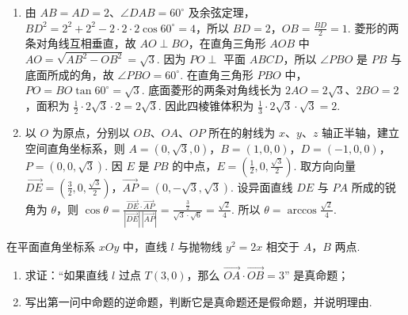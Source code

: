 \begin{solution}
\begin{enumerate}
\item 由 \(AB=AD=2\)、\(\angle DAB=60^{\circ}\) 及余弦定理，\(BD^2=2^2+2^2-2\cdot2\cdot2\cos60^{\circ}=4\)，所以 \(BD=2\)，\(OB=\frac{BD}{2}=1\). 菱形的两条对角线互相垂直，故 \(AO\perp BO\)，在直角三角形 \(AOB\) 中 \(AO=\sqrt{AB^2-OB^2}=\sqrt{3}\). 因为 \(PO\perp\) 平面 \(ABCD\)，所以 \(\angle PBO\) 是 \(PB\) 与底面所成的角，故 \(\angle PBO=60^{\circ}\). 在直角三角形 \(PBO\) 中，\(PO=BO\tan60^{\circ}=\sqrt{3}\). 底面菱形的两条对角线长为 \(2AO=2\sqrt{3}\)、\(2BO=2\)，面积为 \(\frac{1}{2}\cdot2\sqrt{3}\cdot2=2\sqrt{3}\). 因此四棱锥体积为 \(\frac{1}{3}\cdot2\sqrt{3}\cdot\sqrt{3}=2\).
\item 以 \(O\) 为原点，分别以 \(OB\)、\(OA\)、\(OP\) 所在的射线为 \(x\)、\(y\)、\(z\) 轴正半轴，建立空间直角坐标系，则
\(A=(0,\sqrt{3},0)\)，\(B=(1,0,0)\)，\(D=(-1,0,0)\)，\(P=(0,0,\sqrt{3})\). 因 \(E\) 是 \(PB\) 的中点，\(E=\left(\frac{1}{2},0,\frac{\sqrt{3}}{2}\right)\). 取方向向量
\(\overrightarrow{DE}=\left(\frac{3}{2},0,\frac{\sqrt{3}}{2}\right)\)，\(\overrightarrow{AP}=(0,-\sqrt{3},\sqrt{3})\). 设异面直线 \(DE\) 与 \(PA\) 所成的锐角为 \(\theta\)，则
\(\displaystyle \cos\theta=\frac{\overrightarrow{DE}\cdot\overrightarrow{AP}}{|\overrightarrow{DE}|\,|\overrightarrow{AP}|}=\frac{\frac{3}{2}}{\sqrt{3}\cdot\sqrt{6}}=\frac{\sqrt{2}}{4}\). 所以 \(\theta=\arccos\frac{\sqrt{2}}{4}\).
\end{enumerate}
\end{solution}

\begin{problem}
在平面直角坐标系 \(xOy\) 中，直线 \(l\) 与抛物线 \(y^{2} = 2x\) 相交于 \(A\)，\(B\) 两点.

\begin{enumerate}
\item 求证：“如果直线 \(l\) 过点 \(T(3,0)\)，那么 \(\overrightarrow{OA} \cdot \overrightarrow{OB} = 3\)” 是真命题；
\item 写出第一问中命题的逆命题，判断它是真命题还是假命题，并说明理由.
\end{enumerate}
\end{problem}

